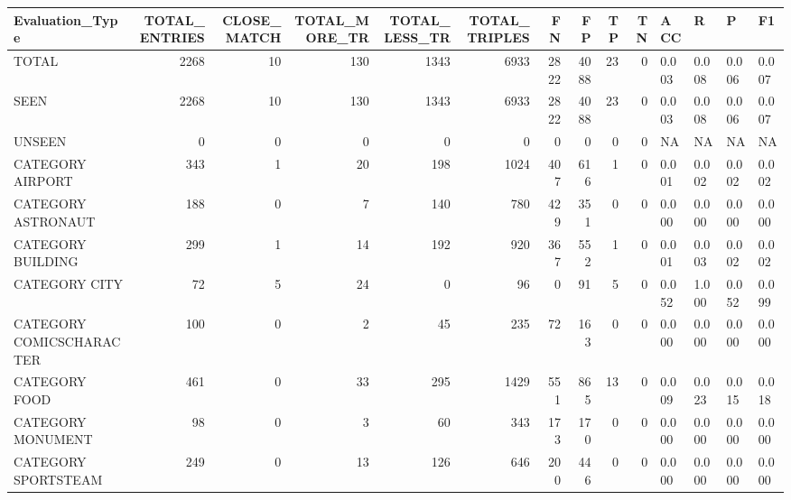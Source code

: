 \begin{tabular}{lrrrrrrrrrllll}
\hline
 Evaluation\_Type          &   TOTAL\_ENTRIES &   CLOSE\_MATCH &   TOTAL\_MORE\_TR &   TOTAL\_LESS\_TR &   TOTAL\_TRIPLES &   FN &   FP &   TP &   TN & ACC   & R     & P     & F1    \\
\hline
 TOTAL                    &            2268 &            10 &             130 &            1343 &            6933 & 2822 & 4088 &   23 &    0 & 0.003 & 0.008 & 0.006 & 0.007 \\
 SEEN                     &            2268 &            10 &             130 &            1343 &            6933 & 2822 & 4088 &   23 &    0 & 0.003 & 0.008 & 0.006 & 0.007 \\
 UNSEEN                   &               0 &             0 &               0 &               0 &               0 &    0 &    0 &    0 &    0 & NA    & NA    & NA    & NA    \\
 CATEGORY AIRPORT         &             343 &             1 &              20 &             198 &            1024 &  407 &  616 &    1 &    0 & 0.001 & 0.002 & 0.002 & 0.002 \\
 CATEGORY ASTRONAUT       &             188 &             0 &               7 &             140 &             780 &  429 &  351 &    0 &    0 & 0.000 & 0.000 & 0.000 & 0.000 \\
 CATEGORY BUILDING        &             299 &             1 &              14 &             192 &             920 &  367 &  552 &    1 &    0 & 0.001 & 0.003 & 0.002 & 0.002 \\
 CATEGORY CITY            &              72 &             5 &              24 &               0 &              96 &    0 &   91 &    5 &    0 & 0.052 & 1.000 & 0.052 & 0.099 \\
 CATEGORY COMICSCHARACTER &             100 &             0 &               2 &              45 &             235 &   72 &  163 &    0 &    0 & 0.000 & 0.000 & 0.000 & 0.000 \\
 CATEGORY FOOD            &             461 &             0 &              33 &             295 &            1429 &  551 &  865 &   13 &    0 & 0.009 & 0.023 & 0.015 & 0.018 \\
 CATEGORY MONUMENT        &              98 &             0 &               3 &              60 &             343 &  173 &  170 &    0 &    0 & 0.000 & 0.000 & 0.000 & 0.000 \\
 CATEGORY SPORTSTEAM      &             249 &             0 &              13 &             126 &             646 &  200 &  446 &    0 &    0 & 0.000 & 0.000 & 0.000 & 0.000 \\

\end{tabular}
